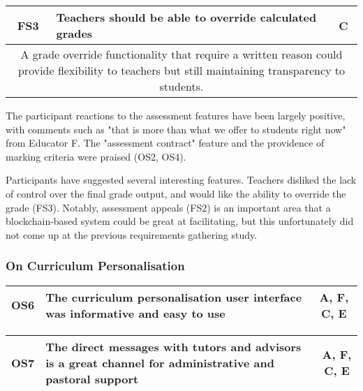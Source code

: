 \begin{table}[!ht]
	\begin{tabularx}{\textwidth}{|c|X|c|}
		\hline
		FS3 & \textbf{Teachers should be able to override calculated grades} & C \\
		\hline
		\multicolumn{3}{|X|}{
			A grade override functionality that require a written reason could provide
			flexibility to teachers but still maintaining transparency to students.
		}                                                                        \\
		\hline
	\end{tabularx}
\end{table}

The participant reactions to the assessment features have been largely positive, 
with comments such as "that is more than what we offer to students right now" from 
Educator F.
The "assessment contract" feature and the providence of marking criteria were praised (OS2, OS4).

Participants have suggested several interesting features.
Teachers disliked the lack of control over the final grade output, and would like 
the ability to override the grade (FS3).
Notably, assessment appeals (FS2) is an important area that a blockchain-based system 
could be great at facilitating, but this unfortunately did not come up at the previous 
requirements gathering study.

\subsubsection{On Curriculum Personalisation}

\begin{table}[!ht]
	\begin{tabularx}{\textwidth}{|c|X|c|}
		\hline
		OS6 & \textbf{The curriculum personalisation user interface was informative and easy to use} & A, F, C, E \\
		\hline
	\end{tabularx}
\end{table}

\begin{table}[!ht]
	\begin{tabularx}{\textwidth}{|c|X|c|}
		\hline
		OS7 & \textbf{The direct messages with tutors and advisors is a great channel for administrative and pastoral support} & A, F, C, E \\
		\hline
	\end{tabularx}
\end{table}

